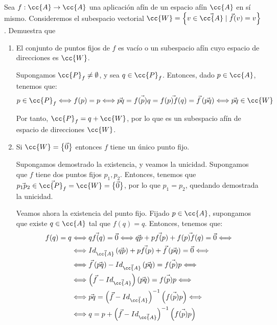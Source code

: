 \begin{ejercicio}
    Sea $f : \cc{A} \to \cc{A}$ una aplicación afín de un espacio afín  $\cc{A}$ en sí mismo. Consideremos el subespacio vectorial $\cc{W} = \left\{v \in \vec{\cc{A}} \mid \vec{f}(v) = v\right\}$. Demuestra que
    \begin{enumerate}
        \item El conjunto de puntos fijos de $f$ es vacío o un subespacio afín cuyo espacio de direcciones es $\cc{W}$.
        
        Supongamos $\cc{P}_f\neq \emptyset$, y sea $q \in \cc{P}_f$. Entonces, dado $p\in \cc{A}$, tenemos que:
        \begin{equation*}
            p\in \cc{P}_f \Longleftrightarrow f(p)=p \Longleftrightarrow \vec{pq} = \vec{f(p)q} = \vec{f(p)f(q)} = \vec{f}\left(\vec{pq}\right) \Longleftrightarrow \vec{pq}\in \cc{W}
        \end{equation*}
        
        Por tanto, $\cc{P}_f = q + \cc{W}$, por lo que es un subespacio afín de espacio de direcciones $\cc{W}$.
        
        \item Si $\cc{W} = \left\{\vec{0}\right\}$ entonces $f$ tiene un único punto fijo.
        
        Supongamos demostrado la existencia, y veamos la unicidad. Supongamos que $f$ tiene dos puntos fijos $p_1,p_2$.
        Entonces, tenemos que $\vec{p_1p_2}\in \vec{\cc{P}_f}=\cc{W}=\left\{\vec{0}\right\}$, por lo que $p_1=p_2$, quedando demostrada la unicidad.

        Veamos ahora la existencia del punto fijo. Fijado $p\in \cc{A}$, supongamos que existe $q\in \cc{A}$ tal que $f(q)=q$. Entonces, tenemos que:
        \begin{align*}
            f(q)=q &\Longleftrightarrow \vec{qf(q)}=\vec{0}
            \Longleftrightarrow \vec{qp}+\vec{pf(p)} + \vec{f(p)f(q)} = \vec{0} \Longleftrightarrow \\
            &\Longleftrightarrow Id_{\vec{\cc{A}}}\left(\vec{qp}\right)+\vec{pf(p)} + \vec{f}\left(\vec{pq}\right) = \vec{0}\Longleftrightarrow \\
            &\Longleftrightarrow \vec{f}\left(\vec{pq}\right) - Id_{\vec{\cc{A}}}\left(\vec{pq}\right) = \vec{f(p)p}\Longleftrightarrow \\
            &\Longleftrightarrow \left(\vec{f} - Id_{\vec{\cc{A}}}\right) \left(\vec{pq}\right) = \vec{f(p)p}\Longleftrightarrow \\
            &\Longleftrightarrow \vec{pq} = \left(\vec{f} - Id_{\vec{\cc{A}}}\right)^{-1}\left(\vec{f(p)p}\right)\Longleftrightarrow \\
            &\Longleftrightarrow q = p + \left(\vec{f} - Id_{\vec{\cc{A}}}\right)^{-1}\left(\vec{f(p)p}\right)
        \end{align*}


\end{enumerate}
\end{ejercicio}
